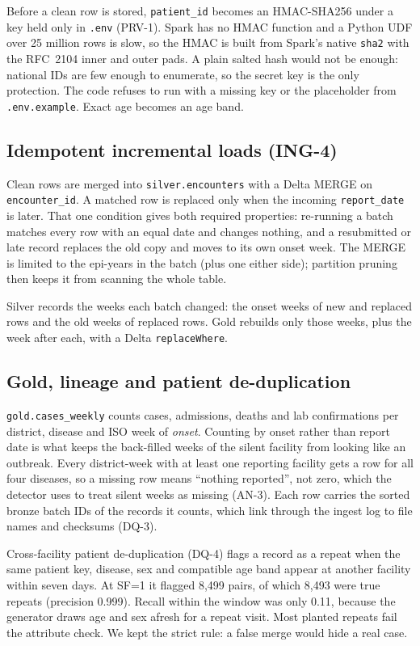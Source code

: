 Before a clean row is stored, \texttt{patient\_id} becomes an HMAC-SHA256 under a key held only in
\texttt{.env} (PRV-1). Spark has no HMAC function and a Python UDF over 25 million rows is slow, so the HMAC is
built from Spark's native \texttt{sha2} with the RFC~2104 inner and outer pads. A plain salted hash would not be
enough: national IDs are few enough to enumerate, so the secret key is the only protection. The code refuses to
run with a missing key or the placeholder from \texttt{.env.example}. Exact age becomes an age band.

\subsection{Idempotent incremental loads (ING-4)}
Clean rows are merged into \texttt{silver.encounters} with a Delta MERGE on \texttt{encounter\_id}. A matched
row is replaced only when the incoming \texttt{report\_date} is later. That one condition gives both required
properties: re-running a batch matches every row with an equal date and changes nothing, and a resubmitted or
late record replaces the old copy and moves to its own onset week. The MERGE is limited to the epi-years in the
batch (plus one either side); partition pruning then keeps it from scanning the whole table.

Silver records the weeks each batch changed: the onset weeks of new and replaced rows and the old weeks of
replaced rows. Gold rebuilds only those weeks, plus the week after each, with a Delta \texttt{replaceWhere}.

\subsection{Gold, lineage and patient de-duplication}
\texttt{gold.cases\_weekly} counts cases, admissions, deaths and lab confirmations per district, disease and
ISO week of \emph{onset}. Counting by onset rather than report date is what keeps the back-filled weeks of the
silent facility from looking like an outbreak. Every district-week with at least one reporting facility gets a
row for all four diseases, so a missing row means ``nothing reported'', not zero, which the detector
uses to treat silent weeks as missing (AN-3). Each row carries the sorted bronze batch IDs of the records it
counts, which link through the ingest log to file names and checksums (DQ-3).

Cross-facility patient de-duplication (DQ-4) flags a record as a repeat when the same patient key, disease,
sex and compatible age band appear at another facility within seven days. At SF=1 it flagged 8,499 pairs, of
which 8,493 were true repeats (precision 0.999). Recall within the window was only 0.11, because the
generator draws age and sex afresh for a repeat visit. Most planted repeats fail the attribute check. We
kept the strict rule: a false merge would hide a real case.

